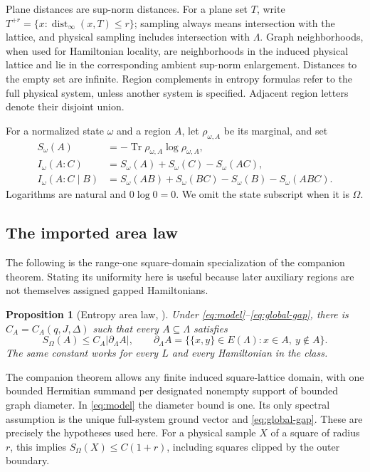 \documentclass[11pt]{article}
\numberwithin{equation}{section}
\newtheorem{proposition}[theorem]{Proposition}
\theoremstyle{definition}
\theoremstyle{remark}
\begin{document}
Plane distances are sup-norm distances. For a plane set $T$, write
$T^{+r}=\{x:\operatorname{dist}_\infty(x,T)\le r\}$; sampling always means intersection
with the lattice, and physical sampling includes intersection with $\Lambda$.
Graph neighborhoods, when used for Hamiltonian locality, are neighborhoods
in the induced physical lattice and lie in the corresponding ambient
sup-norm enlargement. Distances to the empty set are infinite. Region
complements in entropy formulas refer to the full physical system, unless
another system is specified. Adjacent region letters denote their disjoint
union.

For a normalized state $\omega$ and a region $A$, let $\rho_{\omega,A}$
be its marginal, and set
\begin{align*}
 S_\omega(A)&=-\operatorname{Tr}\rho_{\omega,A}\log\rho_{\omega,A},\\
 I_\omega(A:C)&=S_\omega(A)+S_\omega(C)-S_\omega(AC),\\
 I_\omega(A:C\mid B)&=S_\omega(AB)+S_\omega(BC)
                    -S_\omega(B)-S_\omega(ABC).
\end{align*}
Logarithms are natural and $0\log0=0$. We omit the state subscript when it
is $\Omega$.

\subsection{The imported area law}

The following is the range-one square-domain specialization of the companion
theorem. Stating its uniformity here is useful because later auxiliary
regions are not themselves assigned gapped Hamiltonians.

\begin{proposition}[Entropy area law, {\cite[Theorem~1.1 and Corollary~1.2]{RepoAreaLaw}}]
\label{prop:area-law}
Under \eqref{eq:model}--\eqref{eq:global-gap}, there is
$C_A=C_A(q,J,\Delta)$ such that every $A\subseteq\Lambda$ satisfies
\[
 S_\Omega(A)\le C_A|\partial_\Lambda A|,
 \qquad
 \partial_\Lambda A=\{\{x,y\}\in E(\Lambda):x\in A,
                                      \ y\notin A\}.
\]
The same constant works for every $L$ and every Hamiltonian in the class.
\end{proposition}

The companion theorem allows any finite induced square-lattice domain, with one
bounded Hermitian summand per designated nonempty support of bounded graph
diameter. In \eqref{eq:model} the diameter bound is one. Its only spectral
assumption is the unique full-system ground vector and
\eqref{eq:global-gap}. These are precisely the hypotheses used here.
For a physical sample $X$ of a square of radius $r$, this implies
$S_\Omega(X)\le C(1+r)$, including squares clipped by the outer boundary.
\end{document}
